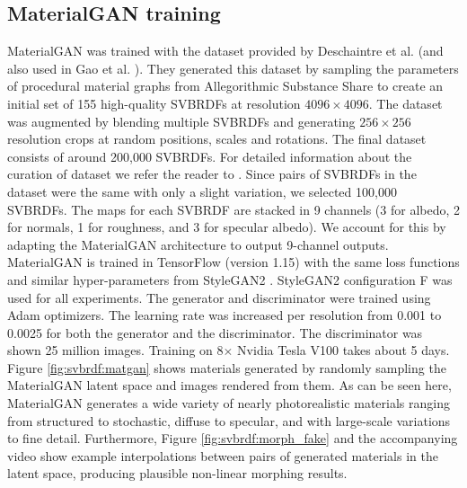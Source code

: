 \subsection{MaterialGAN training}
\label{ssec:training}

MaterialGAN was trained with the dataset provided by Deschaintre et al. \cite{Deschaintre2018} (and also used in Gao et al. \cite{Gao2019}). They generated this dataset by sampling the parameters of procedural material graphs from Allegorithmic Substance Share to create an initial set of 155 high-quality SVBRDFs at resolution $4096 \times 4096$. The dataset was augmented by blending multiple SVBRDFs and generating $256 \times 256$ resolution crops at random positions, scales and rotations. The final dataset consists of around 200,000 SVBRDFs. For detailed information about the curation of dataset we refer the reader to \cite{Deschaintre2018}. Since pairs of SVBRDFs in the dataset were the same with only a slight variation, we selected 100,000 SVBRDFs.
The maps for each SVBRDF are stacked in 9 channels (3 for albedo, 2 for normals, 1 for roughness, and 3 for specular albedo). We account for this by adapting the MaterialGAN architecture to output 9-channel outputs. MaterialGAN is trained in TensorFlow (version 1.15) with the same loss functions and similar hyper-parameters from StyleGAN2 \cite{StyleGAN2}. StyleGAN2 configuration F was used for all experiments. The generator and discriminator were trained using Adam optimizers. The learning rate was increased per resolution from 0.001 to 0.0025 for both the generator and the discriminator. The discriminator was shown 25 million images. Training on 8$\times$ Nvidia Tesla V100 takes about 5 days.
Figure \ref{fig:svbrdf:matgan} shows materials generated by randomly sampling the MaterialGAN latent space and images rendered from them. As can be seen here, MaterialGAN generates a wide variety of nearly photorealistic materials ranging from structured to stochastic, diffuse to specular, and with large-scale variations to fine detail. Furthermore, Figure \ref{fig:svbrdf:morph_fake} and the accompanying video show example interpolations between pairs of generated materials in the latent space, producing plausible non-linear morphing results.


